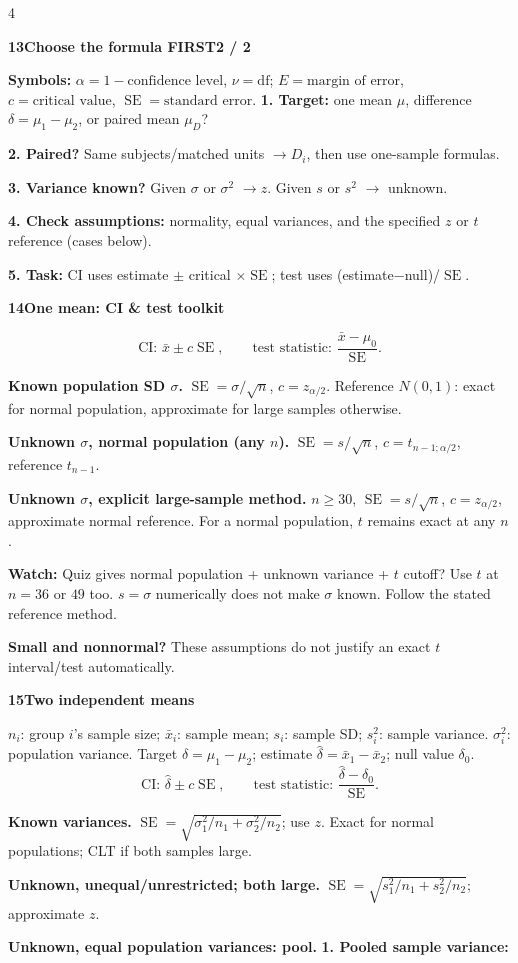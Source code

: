 \documentclass[a4paper,landscape]{article}
\newcommand{\head}[2][late]{\par\vspace{3pt}\noindent\colorbox{#1}{\parbox{\dimexpr\linewidth-6pt}{\color{white}\bfseries #2}}\par\vspace{1pt}}
\newcommand{\cue}[1]{\par\textbf{#1}\enspace}
\newcommand{\trap}[1]{\par{\color{alert}\textbf{Watch:} #1}}
\newcommand{\SE}{\operatorname{SE}}
\newcommand{\xb}{\bar x}
\begin{document}
\begin{multicols*}{4}
\head{13\quad Choose the formula FIRST\hfill 2 / 2}
\textbf{Symbols:} \(\alpha=1-\text{confidence level}\), \(\nu=\text{df}\); \(E=\text{margin of error}\), \(c=\text{critical value}\), \(\SE=\text{standard error}\).
\textbf{1. Target:} one mean \(\mu\), difference \(\delta=\mu_1-\mu_2\), or paired mean \(\mu_D\)?\par
\textbf{2. Paired?} Same subjects/matched units \(\to D_i\), then use one-sample formulas.\par
\textbf{3. Variance known?} Given \(\sigma\) or \(\sigma^2\) \(\to z\). Given \(s\) or \(s^2\) \(\to\) unknown.\par
\textbf{4. Check assumptions:} normality, equal variances, and the specified \(z\) or \(t\) reference (cases below).\par
\textbf{5. Task:} CI uses estimate \(\pm\) critical \(\times\SE\); test uses (estimate\(-\)null)/\(\SE\).
\head{14\quad One mean: CI \& test toolkit}
\[\text{CI: }\xb\pm c\SE,\qquad
 \text{test statistic: }\frac{\xb-\mu_0}{\SE}.\]
\cue{Known population SD \(\sigma\).}
\(\SE=\sigma/\sqrt n\), \(c=z_{\alpha/2}\). Reference \(N(0,1)\): exact for normal population, approximate for large samples otherwise.
\cue{Unknown \(\sigma\), normal population (any \(n\)).}
\(\SE=s/\sqrt n\), \(c=t_{n-1;\alpha/2}\), reference \(t_{n-1}\).
\cue{Unknown \(\sigma\), explicit large-sample method.}
\(n\ge30\), \(\SE=s/\sqrt n\), \(c=z_{\alpha/2}\), approximate normal reference. For a normal population, \(t\) remains exact at any \(n\).
\trap{Quiz gives normal population + unknown variance + \(t\) cutoff? Use \(t\) at \(n=36\) or \(49\) too. \(s=\sigma\) numerically does not make \(\sigma\) known. Follow the stated reference method.}
\cue{Small and nonnormal?} These assumptions do not justify an exact \(t\) interval/test automatically.
\head{15\quad Two independent means}
\(n_i\): group \(i\)'s sample size; \(\xb_i\): sample mean; \(s_i\): sample SD; \(s_i^2\): sample variance. \(\sigma_i^2\): population variance. Target \(\delta=\mu_1-\mu_2\); estimate \(\hat\delta=\xb_1-\xb_2\); null value \(\delta_0\).
\[\text{CI: }\hat\delta\pm c\SE,\qquad
 \text{test statistic: }\frac{\hat\delta-\delta_0}{\SE}.\]
\cue{Known variances.}
\(\SE=\sqrt{\sigma_1^2/n_1+\sigma_2^2/n_2}\); use \(z\). Exact for normal populations; CLT if both samples large.
\cue{Unknown, unequal/unrestricted; both large.}
\(\SE=\sqrt{s_1^2/n_1+s_2^2/n_2}\); approximate \(z\).
\cue{Unknown, equal population variances: pool.}
\textbf{1. Pooled sample variance:}

\end{multicols*}
\end{document}
